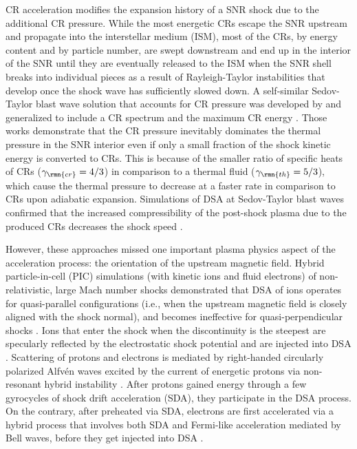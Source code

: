 \documentclass[8pt,a4paper,usenatbib]{mnras}
\begin{document}
CR acceleration modifies the expansion history of a SNR shock due to the
additional CR pressure.  While the most energetic CRs escape the SNR upstream
and propagate into the interstellar medium (ISM), most of the CRs, by energy
content and by particle number, are swept downstream and end up in the interior
of the SNR \citep{2013MNRAS.431..415B} until they are eventually released to the
ISM when the SNR shell breaks into individual pieces as a result of
Rayleigh-Taylor instabilities that develop once the shock wave has sufficiently
slowed down. A self-similar Sedov-Taylor blast wave solution that accounts for
CR pressure was developed by \citet{1983ApJ...272..765C} and generalized to
include a CR spectrum and the maximum CR energy
\citep{2015MNRAS.447.2224B}. Those works demonstrate that the CR pressure
inevitably dominates the thermal pressure in the SNR interior even if only a
small fraction of the shock kinetic energy is converted to CRs. This is because
of the smaller ratio of specific heats of CRs ($\gamma_{\rmn{cr}}=4/3$) in
comparison to a thermal fluid ($\gamma_{\rmn{th}}=5/3$), which cause the thermal
pressure to decrease at a faster rate in comparison to CRs upon adiabatic
expansion.  Simulations of DSA at Sedov-Taylor blast waves confirmed that the
increased compressibility of the post-shock plasma due to the produced CRs
decreases the shock speed \citep[][for one- and three-dimensional simulations,
  respectively]{2011ApJ...734...85C,2017MNRAS.465.4500P}.


However, these approaches missed one important plasma physics aspect of the
acceleration process: the orientation of the upstream magnetic field. Hybrid
particle-in-cell (PIC) simulations (with kinetic ions and fluid electrons) of
non-relativistic, large Mach number shocks demonstrated that DSA of ions
operates for quasi-parallel configurations (i.e., when the upstream magnetic
field is closely aligned with the shock normal), and becomes ineffective for
quasi-perpendicular shocks \citep{2014ApJ...783...91C}.  Ions that enter the
shock when the discontinuity is the steepest are specularly reflected by the
electrostatic shock potential and are injected into DSA
\citep{2015ApJ...798L..28C}.  Scattering of protons and electrons is mediated by
right-handed circularly polarized Alfv{\'e}n waves excited by the current of
energetic protons via non-resonant hybrid instability
\citep{2004MNRAS.353..550B}. After protons gained energy through a few
gyrocycles of shock drift acceleration (SDA), they participate in the DSA
process. On the contrary, after preheated via SDA, electrons are first
accelerated via a hybrid process that involves both SDA and Fermi-like
acceleration mediated by Bell waves, before they get injected into DSA
\citep{2015PhRvL.114h5003P}.
\end{document}
